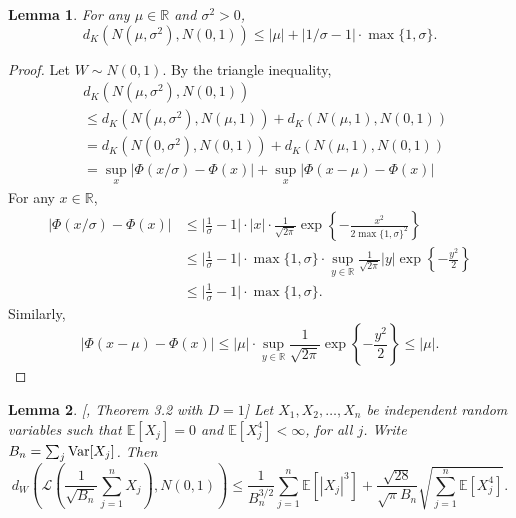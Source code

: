 \documentclass[11pt]{article}
\newtheorem{lemma}{Lemma}
\newcommand{\Var}{\textnormal{Var}}
\def\R{\mathbb{R}}
\def\E{\mathbb{E}}
\begin{document}
\begin{lemma}\label{lem:dK_normal}
  For any $\mu\in \R$ and $\sigma^2 > 0$,
  \[d_{K}(N(\mu, \sigma^2), N(0, 1))\le |\mu| + |1/\sigma - 1|\cdot \max\{1, \sigma\}.\]
\end{lemma}
\begin{proof}
  Let $W\sim N(0, 1)$. By the triangle inequality,
  \begin{align*}
    &d_{K}(N(\mu, \sigma^2), N(0, 1))\\
    &\le d_{K}(N(\mu, \sigma^2), N(\mu, 1)) + d_{K}(N(\mu, 1), N(0, 1))\\
    &= d_{K}(N(0, \sigma^2), N(0, 1)) + d_{K}(N(\mu, 1), N(0, 1))\\
    & = \sup_{x}|\Phi(x / \sigma) - \Phi(x)| + \sup_{x}|\Phi(x - \mu) - \Phi(x)|
  \end{align*}
  For any $x\in \R$, 
  \begin{align*}
    |\Phi(x / \sigma) - \Phi(x)| & \le \bigg|\frac{1}{\sigma} - 1\bigg|\cdot |x| \cdot \frac{1}{\sqrt{2\pi}}\exp\left\{-\frac{x^2}{2\max\{1, \sigma\}^2}\right\}\\
                                 & \le \bigg|\frac{1}{\sigma} - 1\bigg|\cdot \max\{1, \sigma\} \cdot \sup_{y\in \R}\frac{1}{\sqrt{2\pi}}|y|\exp\left\{-\frac{y^2}{2}\right\}\\
    & \le \bigg|\frac{1}{\sigma} - 1\bigg|\cdot \max\{1, \sigma\}.
  \end{align*}
  Similarly,
  \[|\Phi(x - \mu) - \Phi(x)|\le |\mu| \cdot \sup_{y\in \R}\frac{1}{\sqrt{2\pi}}\exp\left\{-\frac{y^2}{2}\right\}\le |\mu|.\]
\end{proof}

\begin{lemma}\label{lem:dW_CLT}[\citet{ross2011fundamentals}, Theorem 3.2 with $D = 1$]
  Let $X_1, X_2, \ldots, X_{n}$ be independent random variables such that $\E[X_j] = 0$ and $\E[X_j^4] <\infty$, for all $j$. Write $B_{n} = \sum_{j}\Var[X_j]$. Then
  \[d_{W}\left(\mathcal{L}\left(\frac{1}{\sqrt{B_n}}\sum_{j=1}^{n}X_j\right), N(0, 1)\right)\le \frac{1}{B_n^{3/2}}\sum_{j=1}^{n}\E[|X_j|^3] + \frac{\sqrt{28}}{\sqrt{\pi}B_n}\sqrt{\sum_{j=1}^{n}\E[X_j^4]}.\]
\end{lemma}
\end{document}
